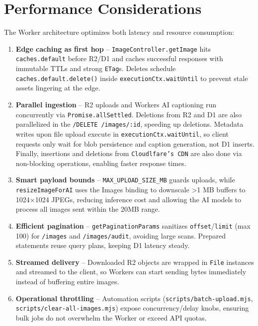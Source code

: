 \documentclass[12pt]{article}
\begin{document}
\section{Performance Considerations}
The Worker architecture optimizes both latency and resource consumption:
\begin{enumerate}[leftmargin=*]
  \item \textbf{Edge caching as first hop} – \texttt{ImageController.getImage} hits \texttt{caches.default} before R2/D1 and caches successful responses with immutable TTLs and strong \texttt{ETag}s. Deletes schedule \texttt{caches.default.delete()} inside \texttt{executionCtx.waitUntil} to prevent stale assets lingering at the edge.
  \item \textbf{Parallel ingestion} – R2 uploads and Workers AI captioning run concurrently via \texttt{Promise.allSettled}. Deletions from R2 and D1 are also parallelized in the \texttt{/DELETE /images/:id}, speeding up deletions. Metadata writes upon file upload execute in \texttt{executionCtx.waitUntil}, so client requests only wait for blob persistence and caption generation, not D1 inserts. Finally, insertions and deletions from \texttt{Cloudlfare's CDN} are also done via non-blocking operations, enabling faster response times.
  \item \textbf{Smart payload bounds} – \texttt{MAX\_UPLOAD\_SIZE\_MB} guards uploads, while \texttt{resizeImageForAI} uses the Images binding to downscale >1 MB buffers to 1024×1024 JPEGs, reducing inference cost and allowing the AI models to process all images sent within the 20MB range.
  \item \textbf{Efficient pagination} – \texttt{getPaginationParams} sanitizes \texttt{offset}/\texttt{limit} (max 100) for \texttt{/images} and \texttt{/images/audit}, avoiding large scans. Prepared statements reuse query plans, keeping D1 latency steady.
  \item \textbf{Streamed delivery} – Downloaded R2 objects are wrapped in \texttt{File} instances and streamed to the client, so Workers can start sending bytes immediately instead of buffering entire images.
  \item \textbf{Operational throttling} – Automation scripts (\texttt{scripts/batch-upload.mjs}, \texttt{scripts/clear-all-images.mjs}) expose concurrency/delay knobs, ensuring bulk jobs do not overwhelm the Worker or exceed API quotas.
\end{enumerate}
\end{document}

